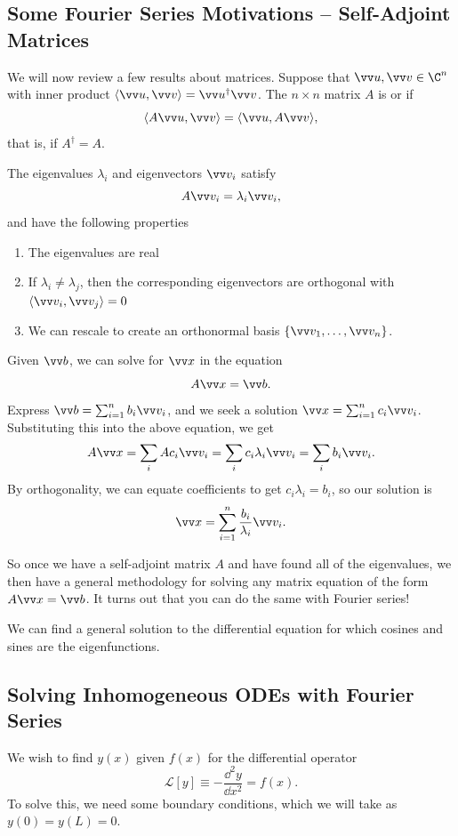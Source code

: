 \subsection{Some Fourier Series Motivations -- Self-Adjoint Matrices}

We will now review a few results about matrices. Suppose that $\vv u, \vv v \in \C^n$ with inner product $\langle \vv u, \vv v\rangle = \vv u^\dagger \vv v$.
The $n \times n$ matrix $A$ is  or  if
$$
\langle A \vv u, \vv v\rangle = \langle \vv u, A \vv v\rangle,
$$
that is, if $A^\dagger = A$.

The eigenvalues $\lambda_i$ and eigenvectors $\vv v_i$ satisfy
$$
A \vv v_i = \lambda_i \vv v_i,
$$
and have the following properties
\begin{enumerate}[label=(\roman*)]
    \item The eigenvalues are real
    \item If $\lambda_i \neq \lambda_j$, then the corresponding eigenvectors are orthogonal with $\langle \vv v_i, \vv v_j\rangle = 0$
    \item We can rescale to create an orthonormal basis $\{\vv v_1, \dots, \vv v_n\}$.
\end{enumerate}

Given $\vv b$, we can solve for $\vv x$ in the equation
$$
A \vv x = \vv b.
$$
Express $\vv b = \sum_{i = 1}^n b_i \vv v_i$, and we seek a solution $\vv x = \sum_{i = 1}^n c_i \vv v_i$. Substituting this into the above equation, we get
$$
A \vv x = \sum_{i} A c_i \vv  v_i = \sum_{i} c_i \lambda_i \vv v_i = \sum_{i} b_i \vv v_i.
$$
By orthogonality, we can equate coefficients to get $c_i \lambda_i = b_i$, so our solution is
$$
\vv x = \sum_{i = 1}^n \frac{b_i}{\lambda_i} \vv v_i.
$$

So once we have a self-adjoint matrix $A$ and have found all of the eigenvalues, we then have a general methodology for solving any matrix equation of the form $A \vv x = \vv b$. It turns out that you can do the same with Fourier series!

We can find a general solution to the differential equation for which cosines and sines are the eigenfunctions.

\subsection{Solving Inhomogeneous ODEs with Fourier Series}

We wish to find $y(x)$ given $f(x)$ for the differential operator
$$
\mathcal{L}[y] \equiv -\frac{\dd^2 y}{\dd x^2} = f(x).
$$
To solve this, we need some boundary conditions, which we will take as $y(0) = y(L) = 0$.

